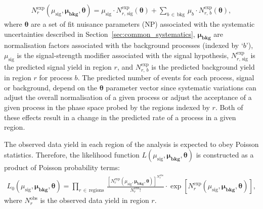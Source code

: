 \begin{align}
    N_r^\text{exp}(\mu_{\text{sig}}, \bm{\mu_{\text{bkg}}}, \bm{\theta}) = \mu_{\text{sig}} \cdot N_{r,\,\text{sig}}^{\text{exp}}(\bm{\theta}) + \sum\limits_{b\,\in \,\text{bkg}} \, \mu_b \cdot N_{r,\,b}^{\text{exp}}(\bm{\theta}),
    \label{eq:test_stat_n_r}
\end{align}
where $\bm{\theta}$ are a set of fit nuisance parameters (NP) associated with the systematic
uncertainties described in Section~\ref{sec:common_systematics},
$\bm{\mu_{\text{bkg}}}$ are normalisation factors associated with the background processes (indexed by `$b$'),
$\mu_{\text{sig}}$ is the signal-strength modifier associated with the signal hypothesis,
$N_{r,\,\text{sig}}^{\text{exp}}$ is the predicted signal yield in region $r$,
and $N_{r,\,b}^{\text{exp}}$ is the predicted background yield in region $r$ for process $b$.
The predicted number of events for each process, signal or background, depend on the $\bm{\theta}$ parameter vector
since systematic variations can adjust the overall normalisation of a given process or adjust
the acceptance of a given process in the phase space probed by the regions indexed by $r$.
Both of these effects result in a change in the predicted rate of a process in a given region.

The observed data yield in each region of the analysis is expected to obey Poisson statistics.
Therefore, the likelihood function $L(\mu_{\text{sig}}, \bm{\mu_{\text{bkg}}}, \bm{\theta})$ is
constructed as a product of Poisson probability terms:
\begin{align}
    L_0(\mu_{\text{sig}}, \bm{\mu_{\text{bkg}}}, \bm{\theta}) = \prod\limits_{r\,\in\,\text{regions}} \, 
            \frac
            {
                \left[N_r^{\text{exp}} ( \mu_{\text{sig}}, \bm{\mu_{\text{bkg}}}, \bm{\theta}) \right] ^ {N_r^{\text{obs}}}
            }
            {
                N_r^{\text{obs}}!
            }
            \cdot
            \exp\left[ N_r^{\text{exp}} ( \mu_{\text{sig}}, \bm{\mu_{\text{bkg}}}, \bm{\theta}) \right],
    \label{eq:likelihood_main}
\end{align}
where $N_r^{\text{obs}}$ is the observed data yield in region $r$.

